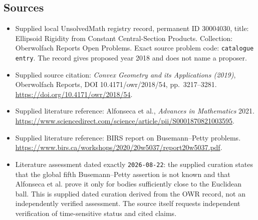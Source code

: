 \documentclass[11pt]{article}
\begin{document}
\subsection{Sources}
\begin{itemize}
\item Supplied local UnsolvedMath registry record, permanent ID \(30004030\), title: Ellipsoid Rigidity from Constant Central-Section Products. Collection: Oberwolfach Reports Open Problems. Exact source problem code: \texttt{catalogue entry}. The record gives proposed year 2018 and does not name a proposer.
\item Supplied source citation: \emph{Convex Geometry and its Applications (2019)}, Oberwolfach Reports, DOI 10.4171/owr/2018/54, pp.\ 3217--3281. \url{https://doi.org/10.4171/owr/2018/54}.
\item Supplied literature reference: Alfonseca et al., \emph{Advances in Mathematics} 2021. \url{https://www.sciencedirect.com/science/article/pii/S0001870821003595}.
\item Supplied literature reference: BIRS report on Busemann--Petty problems. \url{https://www.birs.ca/workshops/2020/20w5037/report20w5037.pdf}.
\item Literature assessment dated exactly \texttt{2026-08-22}: the supplied curation states that the global fifth Busemann--Petty assertion is not known and that Alfonseca et al. prove it only for bodies sufficiently close to the Euclidean ball. This is supplied dated curation derived from the OWR record, not an independently verified assessment. The source itself requests independent verification of time-sensitive status and cited claims.
\end{itemize}
\end{document}
